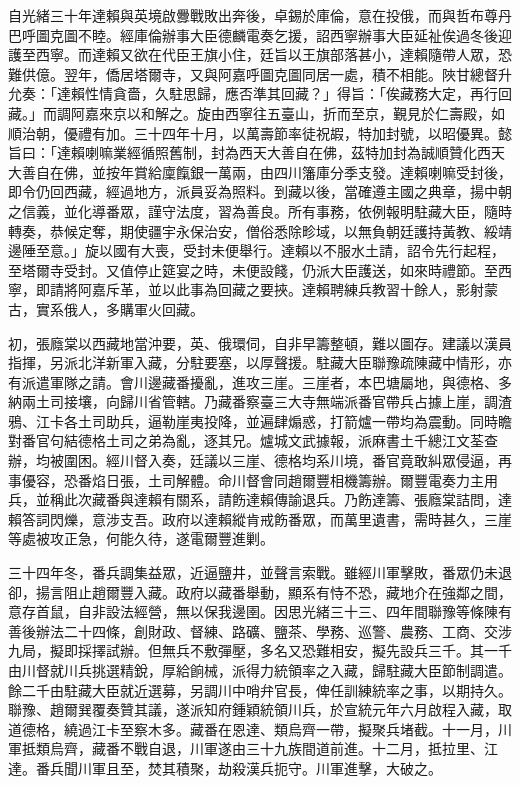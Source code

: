 \begin{pinyinscope}
自光緒三十年達賴與英境啟釁戰敗出奔後，卓錫於庫倫，意在投俄，而與哲布尊丹巴呼圖克圖不睦。經庫倫辦事大臣德麟電奏乞援，詔西寧辦事大臣延祉俟過冬後迎護至西寧。而達賴又欲在代臣王旗小住，廷旨以王旗部落甚小，達賴隨帶人眾，恐難供億。翌年，僑居塔爾寺，又與阿嘉呼圖克圖同居一處，積不相能。陜甘總督升允奏：「達賴性情貪嗇，久駐思歸，應否準其回藏？」得旨：「俟藏務大定，再行回藏。」而調阿嘉來京以和解之。旋由西寧往五臺山，折而至京，覲見於仁壽殿，如順治朝，優禮有加。三十四年十月，以萬壽節率徒祝嘏，特加封號，以昭優異。懿旨曰：「達賴喇嘛業經循照舊制，封為西天大善自在佛，茲特加封為誠順贊化西天大善自在佛，並按年賞給廩餼銀一萬兩，由四川籓庫分季支發。達賴喇嘛受封後，即令仍回西藏，經過地方，派員妥為照料。到藏以後，當確遵主國之典章，揚中朝之信義，並化導番眾，謹守法度，習為善良。所有事務，依例報明駐藏大臣，隨時轉奏，恭候定奪，期使疆宇永保治安，僧俗悉除畛域，以無負朝廷護持黃教、綏靖邊陲至意。」旋以國有大喪，受封未便舉行。達賴以不服水土請，詔令先行起程，至塔爾寺受封。又值停止筵宴之時，未便設餞，仍派大臣護送，如來時禮節。至西寧，即請將阿嘉斥革，並以此事為回藏之要挾。達賴聘練兵教習十餘人，影射蒙古，實系俄人，多購軍火回藏。

初，張廕棠以西藏地當沖要，英、俄環伺，自非早籌整頓，難以圖存。建議以漢員指揮，另派北洋新軍入藏，分駐要塞，以厚聲援。駐藏大臣聯豫疏陳藏中情形，亦有派遣軍隊之請。會川邊藏番擾亂，進攻三崖。三崖者，本巴塘屬地，與德格、多納兩土司接壤，向歸川省管轄。乃藏番察臺三大寺無端派番官帶兵占據上崖，調渣鴉、江卡各土司助兵，逼勒崖夷投降，並遍肆煽惑，打箭爐一帶均為震動。同時瞻對番官句結德格土司之弟為亂，逐其兄。爐城文武據報，派麻書土千總江文荃查辦，均被圍困。經川督入奏，廷議以三崖、德格均系川境，番官竟敢糾眾侵逼，再事優容，恐番焰日張，土司解體。命川督會同趙爾豐相機籌辦。爾豐電奏力主用兵，並稱此次藏番與達賴有關系，請飭達賴傳諭退兵。乃飭達籌、張廕棠詰問，達賴答詞閃爍，意涉支吾。政府以達賴縱肯戒飭番眾，而萬里遺書，需時甚久，三崖等處被攻正急，何能久待，遂電爾豐進剿。

三十四年冬，番兵調集益眾，近逼鹽井，並聲言索戰。雖經川軍擊敗，番眾仍未退卻，揚言阻止趙爾豐入藏。政府以藏番舉動，顯系有恃不恐，藏地介在強鄰之間，意存首鼠，自非設法經營，無以保我邊圉。因思光緒三十三、四年間聯豫等條陳有善後辦法二十四條，創財政、督練、路礦、鹽茶、學務、巡警、農務、工商、交涉九局，擬即採擇試辦。但無兵不敷彈壓，多名又恐難相安，擬先設兵三千。其一千由川督就川兵挑選精銳，厚給餉械，派得力統領率之入藏，歸駐藏大臣節制調遣。餘二千由駐藏大臣就近選募，另調川中哨弁官長，俾任訓練統率之事，以期持久。聯豫、趙爾巽覆奏贊其議，遂派知府鍾穎統領川兵，於宣統元年六月啟程入藏，取道德格，繞過江卡至察木多。藏番在恩達、類烏齊一帶，擬聚兵堵截。十一月，川軍抵類烏齊，藏番不戰自退，川軍遂由三十九族間道前進。十二月，抵拉里、江達。番兵聞川軍且至，焚其積聚，劫殺漢兵扼守。川軍進擊，大破之。


\end{pinyinscope}
